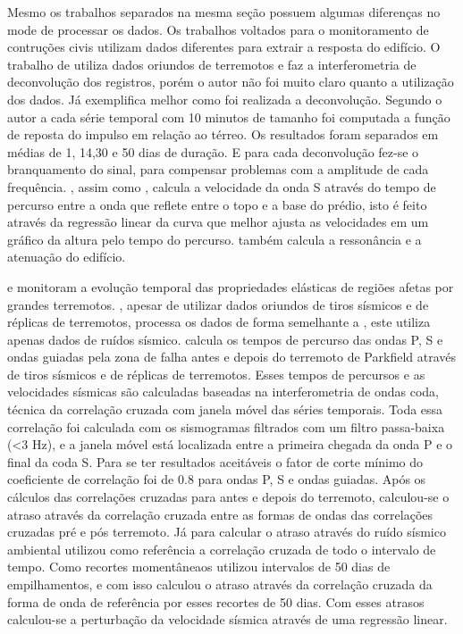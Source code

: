 \documentclass[paper,twocolumn]{geophysics}
\begin{document}
Mesmo os trabalhos separados na mesma seção possuem algumas diferenças no mode de processar os dados. Os trabalhos voltados para o monitoramento de contruções civis utilizam dados diferentes para extrair a resposta do edifício. O trabalho de \cite{nakata_damage_2015} utiliza dados oriundos de terremotos e faz a interferometria de deconvolução dos registros, porém o autor não foi muito claro quanto a utilização dos dados. Já \cite{prieto_impulse_2010} exemplifica melhor como foi realizada a deconvolução. Segundo o autor a cada série temporal com 10 minutos de tamanho foi computada a função de reposta do impulso em relação ao térreo. Os resultados foram separados em médias de 1, 14,30 e 50 dias de duração. E para cada deconvolução fez-se o branquamento do sinal, para compensar problemas com a amplitude de cada frequência. \cite{prieto_impulse_2010}, assim como \cite{nakata_damage_2015}, calcula a velocidade da onda S através do tempo de percurso entre a onda que reflete entre o topo e a base do prédio, isto é feito através da regressão linear da curva que melhor ajusta as velocidades em um gráfico da altura pelo tempo do percurso. \cite{prieto_impulse_2010} também calcula a ressonância e a atenuação do edifício.

\cite{li_seismic_2006} e \cite{zaccarelli_variations_2011} monitoram a evolução temporal das propriedades elásticas de regiões afetas por grandes terremotos. \cite{li_seismic_2006}, apesar de utilizar dados oriundos de tiros sísmicos e de réplicas de terremotos, processa os dados de forma semelhante a \cite{zaccarelli_variations_2011}, este utiliza apenas dados de ruídos sísmico. \cite{li_seismic_2006} calcula os tempos de percurso das ondas P, S e ondas guiadas pela zona de falha antes e depois do terremoto de Parkfield através de tiros sísmicos e de réplicas de terremotos. Esses tempos de percursos e as velocidades sísmicas são calculadas baseadas na interferometria de ondas coda, técnica da correlação cruzada com janela móvel das séries temporais. Toda essa correlação foi calculada com os sismogramas filtrados com um filtro passa-baixa (<3 Hz), e a janela móvel está localizada entre a primeira chegada da onda P e o final da coda S. 	Para se ter resultados aceitáveis o fator de corte mínimo do coeficiente de correlação foi de 0.8 para ondas P, S e ondas guiadas.  Após os cálculos das correlações cruzadas para antes e depois do terremoto, calculou-se o atraso através da correlação cruzada entre as formas de ondas das correlações cruzadas pré e pós terremoto. Já \cite{zaccarelli_variations_2011} para calcular o atraso através do ruído sísmico ambiental utilizou como referência a correlação cruzada de todo o intervalo de tempo. Como recortes momentâneaos utilizou intervalos de 50 dias de empilhamentos, e com isso calculou o atraso através da correlação cruzada da forma de onda de referência por esses recortes de 50 dias. Com esses atrasos calculou-se a perturbação da velocidade sísmica através de uma regressão linear.
\end{document}
